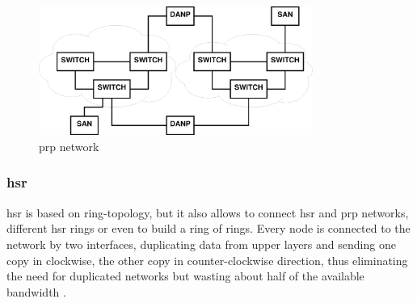 \begin{figure}
    \centering
    \includegraphics[width=0.8\textwidth]{figures/prp.eps}
    \caption{\gls{prp} network}
    \label{fig:prp}
\end{figure}

\subsubsection{\gls{hsr}}
\gls{hsr} is based on ring-topology, but it also allows to connect \gls{hsr} and \gls{prp} networks, different \gls{hsr} rings or even to build a ring of rings. 
Every node is connected to the network by two interfaces, duplicating data from upper layers and sending one copy in clockwise, the other copy in counter-clockwise direction,
thus eliminating the need for duplicated networks but wasting about half of the available bandwidth \cite{6174793}. 
\\


